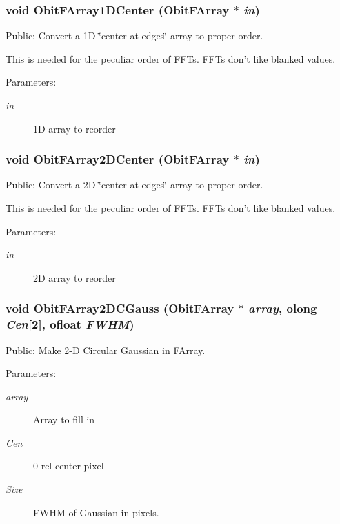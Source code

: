 \subsubsection{\setlength{\rightskip}{0pt plus 5cm}void Obit\-FArray1DCenter ({\bf Obit\-FArray} $\ast$ {\em in})}\label{ObitFArray_8h_a100}


Public: Convert a 1D \char`\"{}center at edges\char`\"{} array to proper order. 

This is needed for the peculiar order of FFTs. FFTs don't like blanked values. \begin{Desc}
\item[Parameters:]
\begin{description}
\item[{\em in}]1D array to reorder \end{description}
\end{Desc}
\subsubsection{\setlength{\rightskip}{0pt plus 5cm}void Obit\-FArray2DCenter ({\bf Obit\-FArray} $\ast$ {\em in})}\label{ObitFArray_8h_a101}


Public: Convert a 2D \char`\"{}center at edges\char`\"{} array to proper order. 

This is needed for the peculiar order of FFTs. FFTs don't like blanked values. \begin{Desc}
\item[Parameters:]
\begin{description}
\item[{\em in}]2D array to reorder \end{description}
\end{Desc}
\subsubsection{\setlength{\rightskip}{0pt plus 5cm}void Obit\-FArray2DCGauss ({\bf Obit\-FArray} $\ast$ {\em array}, {\bf olong} {\em Cen}[2], {\bf ofloat} {\em FWHM})}\label{ObitFArray_8h_a103}


Public: Make 2-D Circular Gaussian in FArray. 

\begin{Desc}
\item[Parameters:]
\begin{description}
\item[{\em array}]Array to fill in \item[{\em Cen}]0-rel center pixel \item[{\em Size}]FWHM of Gaussian in pixels. \end{description}
\end{Desc}
